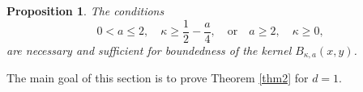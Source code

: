 \documentclass[12pt,twoside,reqno]{amsart}\usepackage[cp1251]{inputenc}
\theoremstyle{plain}
\newtheorem{proposition}[theorem]{Proposition}
\theoremstyle{remark}
\begin{document}
\begin{proposition}\label{concon}
The conditions %
\begin{equation}\label{eq5}
0<a\le 2,\quad \kappa\ge\frac{1}{2}-\frac{a}{4},\quad\text{or}\quad a \ge 2,\quad \kappa\ge 0,
\end{equation}
are necessary and sufficient for boundedness  of the kernel $B_{\kappa,a}(x,y)$.

\end{proposition}


The main goal  of this section is to prove
Theorem \ref{thm2} for $d=1$.

\end{document}

